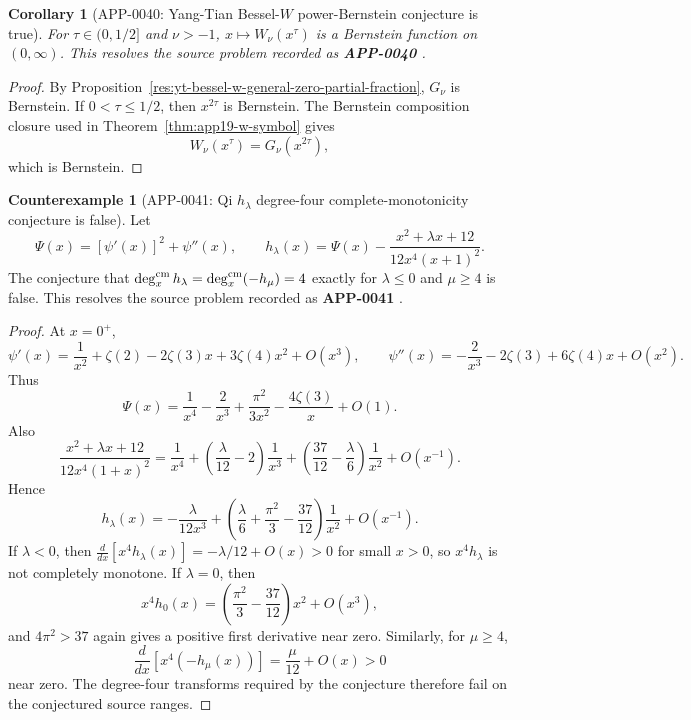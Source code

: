 \documentclass[11pt]{article}
\numberwithin{equation}{section}
\newtheorem{corollary}[theorem]{Corollary}
\theoremstyle{definition}
\newtheorem{counterexample}[theorem]{Counterexample}
\theoremstyle{remark}
\newcommand{\1}{\mathbf 1}
\begin{document}
\begin{corollary}[APP-0040: Yang-Tian Bessel-\(W\) power-Bernstein conjecture is true]
\label{res:yt-bessel-w-power-bernstein-conjecture}
For \(\tau\in(0,1/2]\) and \(\nu>-1\), \(x\mapsto W_\nu(x^\tau)\) is a Bernstein function on \((0,\infty)\).  This resolves the source problem recorded as \textbf{APP-0040} \cite{app-app-0040-source}.
\end{corollary}

\begin{proof}
By Proposition~\ref{res:yt-bessel-w-general-zero-partial-fraction}, \(G_\nu\) is Bernstein.  If \(0<\tau\le1/2\), then \(x^{2\tau}\) is Bernstein.  The Bernstein composition closure used in Theorem~\ref{thm:app19-w-symbol} gives
\[
W_\nu(x^\tau)=G_\nu(x^{2\tau}),
\]
which is Bernstein.
\end{proof}


\begin{counterexample}[APP-0041: Qi \(h_\lambda\) degree-four complete-monotonicity conjecture is false]
\label{res:not-qi-hlambda-degree4-conjecture}
Let
\[
\Psi(x)=[\psi'(x)]^2+\psi''(x),\qquad
h_\lambda(x)=\Psi(x)-\frac{x^2+\lambda x+12}{12x^4(x+1)^2}.
\]
The conjecture that \(\deg_x^{\rm cm}h_\lambda=\deg_x^{\rm cm}(-h_\mu)=4\) exactly for \(\lambda\le0\) and \(\mu\ge4\) is false.  This resolves the source problem recorded as \textbf{APP-0041} \cite{qi-hlambda}.
\end{counterexample}

\begin{proof}
At \(x=0^+\),
\[
\psi'(x)=\frac1{x^2}+\zeta(2)-2\zeta(3)x+3\zeta(4)x^2+O(x^3),
\qquad
\psi''(x)=-\frac2{x^3}-2\zeta(3)+6\zeta(4)x+O(x^2).
\]
Thus
\[
\Psi(x)=\frac1{x^4}-\frac2{x^3}+\frac{\pi^2}{3x^2}-\frac{4\zeta(3)}x+O(1).
\]
Also
\[
\frac{x^2+\lambda x+12}{12x^4(1+x)^2}
=\frac1{x^4}+\left(\frac{\lambda}{12}-2\right)\frac1{x^3}
+\left(\frac{37}{12}-\frac{\lambda}{6}\right)\frac1{x^2}+O(x^{-1}).
\]
Hence
\[
h_\lambda(x)
=-\frac{\lambda}{12x^3}
+\left(\frac{\lambda}{6}+\frac{\pi^2}{3}-\frac{37}{12}\right)\frac1{x^2}
+O(x^{-1}).
\]
If \(\lambda<0\), then \(\frac{d}{dx}[x^4h_\lambda(x)]=-\lambda/12+O(x)>0\) for small \(x>0\), so \(x^4h_\lambda\) is not completely monotone.  If \(\lambda=0\), then
\[
x^4h_0(x)=\left(\frac{\pi^2}{3}-\frac{37}{12}\right)x^2+O(x^3),
\]
and \(4\pi^2>37\) again gives a positive first derivative near zero.  Similarly, for \(\mu\ge4\),
\[
\frac{d}{dx}[x^4(-h_\mu(x))]=\frac{\mu}{12}+O(x)>0
\]
near zero.  The degree-four transforms required by the conjecture therefore fail on the conjectured source ranges.
\end{proof}
\end{document}
